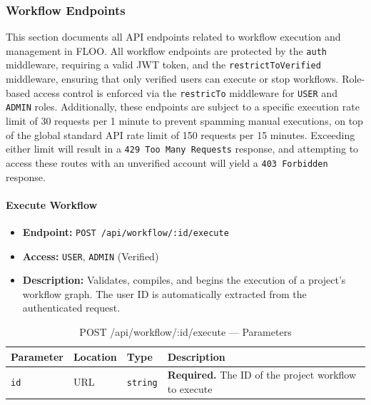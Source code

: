 \subsubsection{Workflow Endpoints}
\label{subsec:workflow-endpoints}

This section documents all API endpoints related to workflow execution and management in FLOO.
All workflow endpoints are protected by the \texttt{auth} middleware, requiring a valid JWT token, and the \texttt{restrictToVerified} middleware, ensuring that only verified users can execute or stop workflows.
Role-based access control is enforced via the \texttt{restricTo} middleware for \texttt{USER} and \texttt{ADMIN} roles.
Additionally, these endpoints are subject to a specific execution rate limit of 30 requests per 1 minute to prevent spamming manual executions, on top of the global standard API rate limit of 150 requests per 15 minutes.
Exceeding either limit will result in a \texttt{429 Too Many Requests} response, and attempting to access these routes with an unverified account will yield a \texttt{403 Forbidden} response.

\paragraph{Execute Workflow}
\label{subsubsec:execute-workflow}

\begin{itemize}
  \item \textbf{Endpoint:} \texttt{POST /api/workflow/:id/execute}
  \item \textbf{Access:} \texttt{USER}, \texttt{ADMIN} (Verified)
  \item \textbf{Description:} Validates, compiles, and begins the execution of a project's workflow graph. The user ID is automatically extracted from the authenticated request.
\end{itemize}

\begin{table}[H]
\centering
\renewcommand{\arraystretch}{1.3}
\begin{tabularx}{\textwidth}{|l|l|l|X|}
\hline
\textbf{Parameter} & \textbf{Location} & \textbf{Type} & \textbf{Description} \\
\hline
\texttt{id} & URL & \texttt{string} & \textbf{Required.} The ID of the project workflow to execute \\
\hline
\end{tabularx}
\caption{POST /api/workflow/:id/execute — Parameters}
\label{tab:execute-workflow-params}
\end{table}

